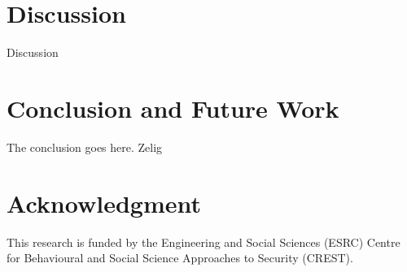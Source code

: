 \documentclass[conference]{IEEEtran}
\begin{document}
%




\section{Discussion}
Discussion


\section{Conclusion and Future Work}
The conclusion goes here.
Zelig \cite{jones2014finding}


\section*{Acknowledgment}
This research is funded by the Engineering and Social Sciences (ESRC) Centre for Behavioural and Social Science Approaches to Security (CREST).



\printbibliography
\end{document}
